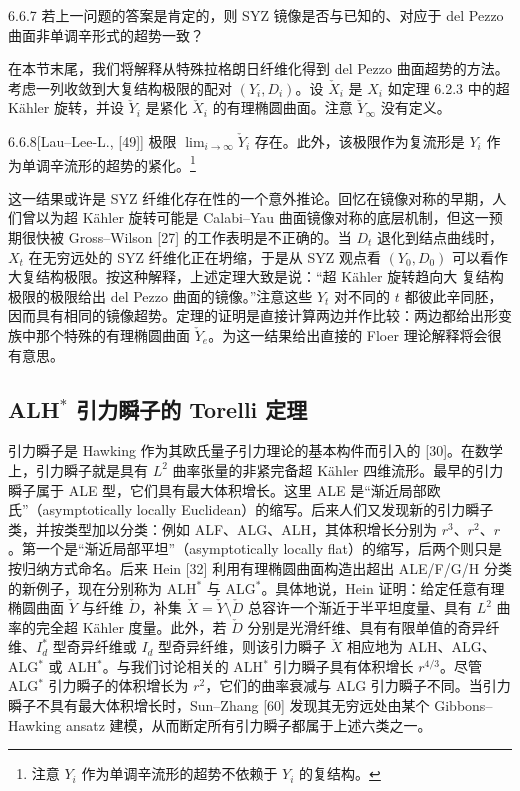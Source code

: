 \begin{question}{6.6.7}
若上一问题的答案是肯定的，则 SYZ 镜像是否与已知的、对应于 del Pezzo 曲面非单调辛形式的超势一致？
\end{question}

在本节末尾，我们将解释从特殊拉格朗日纤维化得到 del Pezzo 曲面超势的方法。考虑一列收敛到大复结构极限的配对 $(Y_i,D_i)$。设 $\check X_i$ 是 $X_i$ 如定理 6.2.3 中的超 Kähler 旋转，并设 $\check Y_i$ 是紧化 $\check X_i$ 的有理椭圆曲面。注意 $\check Y_\infty$ 没有定义。

\begin{theorem}{6.6.8}[{Lau--Lee-L., [49]}]
极限 $\lim_{i\to\infty}\check Y_i$ 存在。此外，该极限作为复流形是 $Y_i$ 作为单调辛流形的超势的紧化。\footnote{注意 $Y_i$ 作为单调辛流形的超势不依赖于 $Y_i$ 的复结构。}
\end{theorem}

这一结果或许是 SYZ 纤维化存在性的一个意外推论。回忆在镜像对称的早期，人们曾以为超 Kähler 旋转可能是 Calabi--Yau 曲面镜像对称的底层机制，但这一预期很快被 Gross--Wilson [27] 的工作表明是不正确的。当 $D_t$ 退化到结点曲线时，$X_t$ 在无穷远处的 SYZ 纤维化正在坍缩，于是从 SYZ 观点看 $(Y_0,D_0)$ 可以看作大复结构极限。按这种解释，上述定理大致是说：“超 Kähler 旋转趋向大
复结构极限的极限给出 del Pezzo 曲面的镜像。”注意这些 $Y_t$ 对不同的 $t$ 都彼此辛同胚，因而具有相同的镜像超势。定理的证明是直接计算两边并作比较：两边都给出形变族中那个特殊的有理椭圆曲面 $\check Y_e$。为这一结果给出直接的 Floer 理论解释将会很有意思。

\subsection{ALH$^*$ 引力瞬子的 Torelli 定理}

引力瞬子是 Hawking 作为其欧氏量子引力理论的基本构件而引入的 [30]。在数学上，引力瞬子就是具有 $L^2$ 曲率张量的非紧完备超 Kähler 四维流形。最早的引力瞬子属于 ALE 型，它们具有最大体积增长。这里 ALE 是“渐近局部欧氏”（asymptotically locally Euclidean）的缩写。后来人们又发现新的引力瞬子类，并按类型加以分类：例如 ALF、ALG、ALH，其体积增长分别为 $r^3$、$r^2$、$r$。第一个是“渐近局部平坦”（asymptotically locally flat）的缩写，后两个则只是按归纳方式命名。后来 Hein [32] 利用有理椭圆曲面构造出超出 ALE/F/G/H 分类的新例子，现在分别称为 ALH$^*$ 与 ALG$^*$。具体地说，Hein 证明：给定任意有理椭圆曲面 $\check Y$ 与纤维 $\check D$，补集 $\check X=\check Y\setminus\check D$ 总容许一个渐近于半平坦度量、具有 $L^2$ 曲率的完全超 Kähler 度量。此外，若 $\check D$ 分别是光滑纤维、具有有限单值的奇异纤维、$I_d^*$ 型奇异纤维或 $I_d$ 型奇异纤维，则该引力瞬子 $\check X$ 相应地为 ALH、ALG、ALG$^*$ 或 ALH$^*$。与我们讨论相关的 ALH$^*$ 引力瞬子具有体积增长 $r^{4/3}$。尽管 ALG$^*$ 引力瞬子的体积增长为 $r^2$，它们的曲率衰减与 ALG 引力瞬子不同。当引力瞬子不具有最大体积增长时，Sun--Zhang [60] 发现其无穷远处由某个 Gibbons--Hawking ansatz 建模，从而断定所有引力瞬子都属于上述六类之一。

